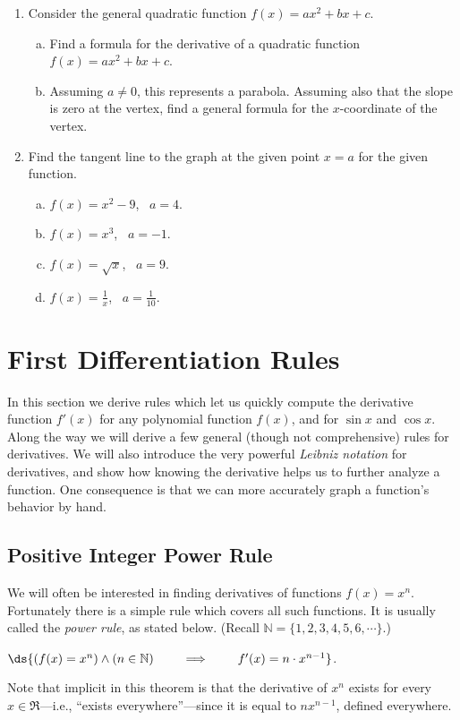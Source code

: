 \begin{multicols}{2}
\begin{enumerate}
\item Consider the general quadratic function $f(x)=ax^2+bx+c$.
\begin{enumerate}[a.]
  \item Find a formula for the derivative of a 
quadratic function $f(x)=ax^2+bx+c$. 
  \item  Assuming $a\ne0$, this represents a parabola.  
Assuming also that the slope is zero at the vertex,
find a general formula for the $x$-coordinate of the
vertex.
\end{enumerate}
\item Find the tangent line to the graph at the given point
$x=a$ for the given function.
\begin{enumerate}[a.]
\item $f(x)=x^2-9$, \ $a=4$.
\item $f(x)=x^3$, \ $a=-1$.
\item $f(x)=\sqrt{x}$, \ $a=9$.
\item $f(x)=\frac1x$, \ $a=\frac1{10}$.
\end{enumerate}
\end{enumerate}\end{multicols}






\newpage\section{First Differentiation Rules
\label{FirstDiffRules}}
In this section we derive rules which let us quickly 
compute the derivative function $f'(x)$ for 
any polynomial function $f(x)$, and for $\sin x$ and $\cos x$.
Along the way we
will derive a few general (though not comprehensive)
rules for derivatives.  We will also introduce the
very powerful {\it Leibniz notation} for derivatives,
and show how knowing the derivative helps us to further
analyze a function.  One consequence is that we can
more accurately graph
a function's behavior by hand.
\subsection{Positive Integer Power Rule}

We will often be interested in finding derivatives of 
functions $f(x)=x^n$. Fortunately there is a simple
rule which covers all such functions.  It is usually
called the {\it power rule}, as stated below. (Recall
$\mathbb{N}=\{1,2,3,4,5,6,\cdots\}$.)

\begin{theorem}
$\ds{
(f(x)=x^n)\wedge(n\in\mathbb{N})\qquad\implies\qquad f'(x)=n\cdot x^{n-1}
}$.
\end{theorem}
Note that implicit in this theorem is that the derivative
of $x^n$ exists for every $x\in\Re$---i.e., ``exists
everywhere''---since it is equal to $nx^{n-1}$, defined
everywhere.

